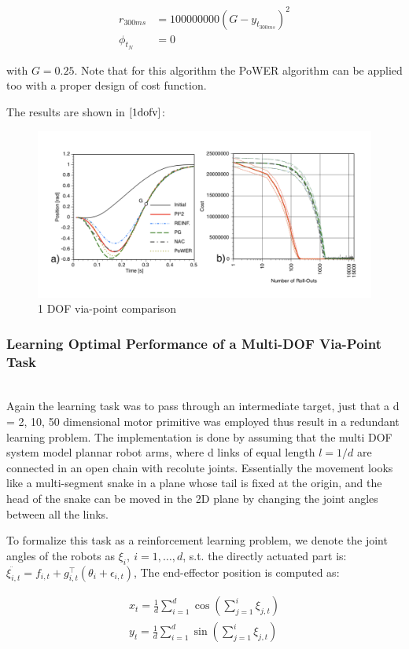\documentclass[journal]{IEEEtran}
\begin{document}
\begin{equation} 
  \begin{aligned}
    r_{300ms} &= 100000000(G- y_{t_{300ms}})^2 \\
    \phi_{t_N} &= 0  \nonumber 
  \end{aligned}
\end{equation}

with $G = 0.25$. Note that for this algorithm the PoWER algorithm can be applied too with a proper design of cost function.

The results are shown in $\ref{1dofv}$:

\begin{figure}[htbp]
  \includegraphics[width = .5\textwidth]{1dofv}
  \caption{1 DOF via-point comparison}
  \label{1dofv}
\end{figure}


\subsubsection{Learning Optimal Performance of a Multi-DOF Via-Point Task}
\ \\
Again the learning task was to pass through an intermediate target, just that a d = 2, 10, 50 dimensional motor primitive was employed thus result in a redundant learning 
problem. The implementation is done by assuming that the multi DOF system model plannar robot arms, where d links of equal length $l = 1/d$ are connected in an open chain
with recolute joints. Essentially the movement looks like a multi-segment snake in a plane whose tail is fixed at the origin, and the head of the snake can be moved in the 
2D plane by changing the joint angles between all the links.

To formalize this task as a reinforcement learning problem, we denote the joint angles of the robots as $\xi_i,\ i=1,\ldots,d $, s.t. the directly actuated part is: 
$\ddot{\xi_{i,t}} = f_{i, t} + g_{i, t}^{\top}(\theta_i + \epsilon_{i,t})$, The end-effector position is computed as: 

\begin{equation}
  \begin{aligned}
    x_t = \frac{1}{d} \sum_{i=1}^{d}\cos(\sum_{j=1}^{i}\xi_{j,t}) \\
    y_t = \frac{1}{d} \sum_{i=1}^{d}\sin(\sum_{j=1}^{i}\xi_{j,t}) \nonumber 
  \end{aligned}
\end{equation}
\end{document}
